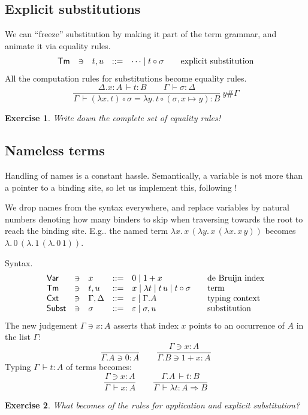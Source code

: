 \documentclass[a4paper,fleqn]{scrartcl}
\makeatletter
\newtheorem{exercise}{Exercise}
\DeclareRobustCommand\onedot{\futurelet\@let@token\@onedot}
\def\@onedot{\ifx\@let@token.\else.\null\fi\xspace}
\def\Eg{E.g\onedot}
\newcommand{\comp}{\circ}
\newcommand{\To}{\Rightarrow}
\newcommand{\der}{\,\vdash}
\newcommand{\ru}[2]{\dfrac{#1}{#2}}
\newcommand{\rux}[3]{\ru{#1}{#2}\ #3}
\newcommand{\Var}{\mathsf{Var}}
\newcommand{\Tm}{\mathsf{Tm}}
\newcommand{\Cxt}{\mathsf{Cxt}}
\newcommand{\Subst}{\mathsf{Subst}}
\newcommand{\Gs}{\ensuremath{\sigma}}
\makeatother
\begin{document}
\subsection{Explicit substitutions}

We can ``freeze'' substitution by making it part of the term grammar,
and animate it via equality rules.
\[
\begin{array}{lllrl@{\qquad}l}
\Tm & \ni & t,u & ::= & \dots \mid t \comp \Gs
  & \mbox{explicit substitution} \\
\end{array}
\]
All the computation rules for substitutions become equality rules.
\[
\rux{\Delta.x{:}A \der t : B \qquad \Gamma \der \Gs : \Delta
   }{\Gamma \der (\lambda x.\,t) \comp \Gs
              = \lambda y.\,t \comp (\Gs,x{\mapsto}y) : B
   }{y \# \Gamma}
\]
\begin{exercise}
Write down the complete set of equality rules!
\end{exercise}


\subsection{Nameless terms}

Handling of names is a constant hassle.  Semantically, a variable is
not more than a pointer to a binding site, so let us implement this,
following \textcite{Bruijn72}!

We drop names from the syntax everywhere, and replace variables by
natural numbers denoting how many binders to skip when traversing
towards the root to reach the binding site. \Eg the named term
$\lambda x.\,x\,(\lambda y.\,x\,(\lambda x.\,x\,y))$ becomes
$\lambda.\,0\,(\lambda.\,1\,(\lambda.\,0\,1))$.

Syntax.
\[
\begin{array}{lllrl@{\qquad}l}
\Var & \ni & x & ::= & 0 \mid 1 + x & \mbox{de Bruijn index} \\
\Tm & \ni & t,u & ::= & x \mid \lambda t \mid t \, u \mid t \comp \Gs & \mbox{term}
  \\
\Cxt & \ni & \Gamma,\Delta & ::= & \varepsilon \mid \Gamma.A
  & \mbox{typing context}\\
\Subst & \ni & \sigma & ::= & \varepsilon \mid \sigma,u
  & \mbox{substitution} \\
\end{array}
\]
The new judgement $\Gamma \ni x : A$ asserts that index $x$ points to an occurrence of $A$ in the list $\Gamma$:
\[
  \ru{}{\Gamma.A \ni 0 : A}
\qquad
  \ru{\Gamma \ni x : A}{\Gamma.B \ni 1 + x : A}
\]
Typing $\Gamma \der t : A$ of terms becomes:
\[
  \ru{\Gamma \ni x : A}{\Gamma \der x : A}
\qquad
  \ru{\Gamma.A \der t : B
    }{\Gamma \der \lambda t : A \To B}
\]
\begin{exercise}
What becomes of the rules for application and explicit substitution?
\end{exercise}
\end{document}
